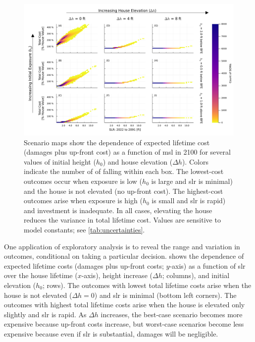 \documentclass{agujournal2019}
\begin{document}
\begin{figure}
  \includegraphics[width=\textwidth]{scenario-map-slr-cost}
  \caption{
    Scenario maps show the dependence of expected lifetime cost (damages plus up-front cost) as a function of \acrfull{msl} in 2100 for several values of initial height ($h_0$) and house elevation ($\Delta h$).
    Colors indicate the number of  of falling within each box.
    The lowest-cost outcomes occur when exposure is low ($h_0$ is large and \acrfull{slr} is minimal) and the house is not elevated (no up-front cost).
    The highest-cost outcomes arise when exposure is high ($h_0$ is small and \gls{slr} is rapid) and investment is inadequate.
    In all cases, elevating the house reduces the variance in total lifetime cost.
    Values are sensitive to model constants; see \cref{tab:uncertainties}.
  }\label{fig:scenario-map-slr-cost}
\end{figure}

One application of exploratory analysis is to reveal the range and variation in outcomes, conditional on taking a particular decision.
 shows the dependence of expected lifetime costs (damages plus up-front costs; $y$-axis) as a function of  \gls{slr} over the house lifetime ($x$-axis), height increase ($\Delta h$; columns), and initial elevation ($h_0$; rows).
The outcomes with lowest total lifetime costs arise when the house is not elevated ($\Delta h = 0$) and \gls{slr} is minimal (bottom left corners).
The outcomes with highest total lifetime costs arise when the house is elevated only slightly and \gls{slr} is rapid.
As $\Delta h$ increases, the best-case scenario becomes more expensive because up-front costs increase, but worst-case scenarios become less expensive because even if \gls{slr} is substantial, damages will be negligible.
\end{document}
